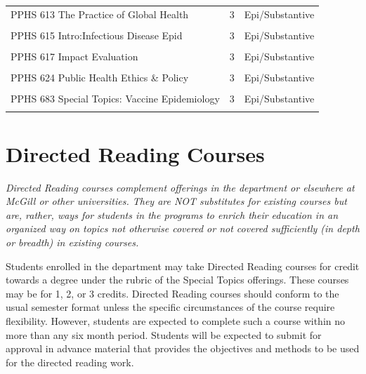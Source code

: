 \documentclass[
]{book}
\begin{document}
\begin{table}
{\begin{tabular}[t]{l|r|l}
\hline
\cellcolor{gray!6}{PPHS 612 Principles/Pub Hlth Practice} & \cellcolor{gray!6}{3} & \cellcolor{gray!6}{Epi/Substantive}\\
\hline
PPHS 613 The Practice of Global Health & 3 & Epi/Substantive\\
\hline
\cellcolor{gray!6}{PPHS 614 Knowledge Translation and Public Health Leadership} & \cellcolor{gray!6}{3} & \cellcolor{gray!6}{Epi/Substantive}\\
\hline
PPHS 615 Intro:Infectious Disease Epid & 3 & Epi/Substantive\\
\hline
\cellcolor{gray!6}{PPHS 616 Principles \& Practice of Public Health Surveillance} & \cellcolor{gray!6}{3} & \cellcolor{gray!6}{Epi/Substantive}\\
\hline
PPHS 617 Impact Evaluation & 3 & Epi/Substantive\\
\hline
\cellcolor{gray!6}{PPHS 618 Program Planning and Evaluation in Public Health} & \cellcolor{gray!6}{3} & \cellcolor{gray!6}{Epi/Substantive}\\
\hline
PPHS 624 Public Health Ethics \& Policy & 3 & Epi/Substantive\\
\hline
\cellcolor{gray!6}{PPHS 682 Special Topics: Critical Perspectives on Global Health} & \cellcolor{gray!6}{2} & \cellcolor{gray!6}{Epi/Substantive}\\
\hline
PPHS 683 Special Topics: Vaccine Epidemiology & 3 & Epi/Substantive\\
\hline
\cellcolor{gray!6}{PPHS 684 Special Topics: Foundations of Health Promotion} & \cellcolor{gray!6}{3} & \cellcolor{gray!6}{Epi/Substantive}\\
\hline
\end{tabular}}
\end{table}

\hypertarget{directed-reading-courses}{%
\section{Directed Reading Courses}\label{directed-reading-courses}}

\emph{Directed Reading courses complement offerings in the department or elsewhere at McGill or other universities. They are NOT substitutes for existing courses but are, rather, ways for students in the programs to enrich their education in an organized way on topics not otherwise covered or not covered sufficiently (in depth or breadth) in existing courses.}

Students enrolled in the department may take Directed Reading courses for credit towards a degree under the rubric of the Special Topics offerings. These courses may be for 1, 2, or 3 credits. Directed Reading courses should conform to the usual semester format unless the specific circumstances of the course require flexibility. However, students are expected to complete such a course within no more than any six month period. Students will be expected to submit for approval in advance material that provides the objectives and methods to be used for the directed reading work.
\end{document}
